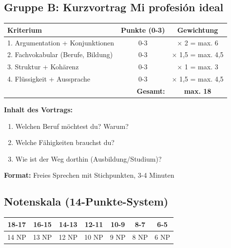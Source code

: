\documentclass[11pt, a4paper]{article}
\begin{document}
\subsection{Gruppe B: Kurzvortrag \glqq{}Mi profesión ideal\grqq{}}

\begin{center}
\begin{tabular}{|p{4.5cm}|c|c|}
    \hline
    \textbf{Kriterium} & \textbf{Punkte (0-3)} & \textbf{Gewichtung} \\
    \hline
    1. Argumentation + Konjunktionen & 0-3 & $\times$ 2 = max. 6 \\
    \hline
    2. Fachvokabular (Berufe, Bildung) & 0-3 & $\times$ 1,5 = max. 4,5 \\
    \hline
    3. Struktur + Kohärenz & 0-3 & $\times$ 1 = max. 3 \\
    \hline
    4. Flüssigkeit + Aussprache & 0-3 & $\times$ 1,5 = max. 4,5 \\
    \hline
    \multicolumn{2}{|r|}{\textbf{Gesamt:}} & \textbf{max. 18} \\
    \hline
\end{tabular}
\end{center}

\textbf{Inhalt des Vortrags:}
\begin{enumerate}[leftmargin=2em]
    \item Welchen Beruf möchtest du? Warum?
    \item Welche Fähigkeiten brauchst du?
    \item Wie ist der Weg dorthin (Ausbildung/Studium)?
\end{enumerate}

\textbf{Format:} Freies Sprechen mit Stichpunkten, 3-4 Minuten

\subsection{Notenskala (14-Punkte-System)}

\begin{center}
\begin{tabular}{|c|c|c|c|c|c|c|}
    \hline
    18-17 & 16-15 & 14-13 & 12-11 & 10-9 & 8-7 & 6-5 \\
    \hline
    14 NP & 13 NP & 12 NP & 10 NP & 9 NP & 8 NP & 6 NP \\
    \hline
\end{tabular}
\end{center}

\end{document}
